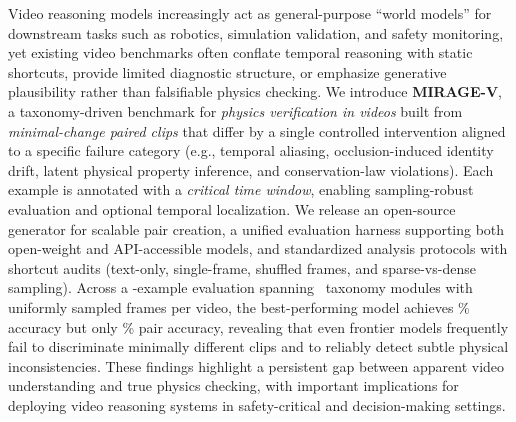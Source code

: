Video reasoning models increasingly act as general-purpose ``world models'' for downstream tasks such as robotics, simulation validation, and safety monitoring, yet existing video benchmarks often conflate temporal reasoning with static shortcuts, provide limited diagnostic structure, or emphasize generative plausibility rather than falsifiable physics checking.
We introduce \textbf{MIRAGE-V}, a taxonomy-driven benchmark for \emph{physics verification in videos} built from \emph{minimal-change paired clips} that differ by a single controlled intervention aligned to a specific failure category (e.g., temporal aliasing, occlusion-induced identity drift, latent physical property inference, and conservation-law violations).
Each example is annotated with a \emph{critical time window}, enabling sampling-robust evaluation and optional temporal localization.
We release an open-source generator for scalable pair creation, a unified evaluation harness supporting both open-weight and API-accessible models, and standardized analysis protocols with shortcut audits (text-only, single-frame, shuffled frames, and sparse-vs-dense sampling).
Across a \NumExamples-example evaluation spanning \NumModules\ taxonomy modules with \FramesPerVideo uniformly sampled frames per video, the best-performing model achieves \BestAcc\% accuracy but only \BestPairAcc\% pair accuracy, revealing that even frontier models frequently fail to discriminate minimally different clips and to reliably detect subtle physical inconsistencies.
These findings highlight a persistent gap between apparent video understanding and true physics checking, with important implications for deploying video reasoning systems in safety-critical and decision-making settings.
